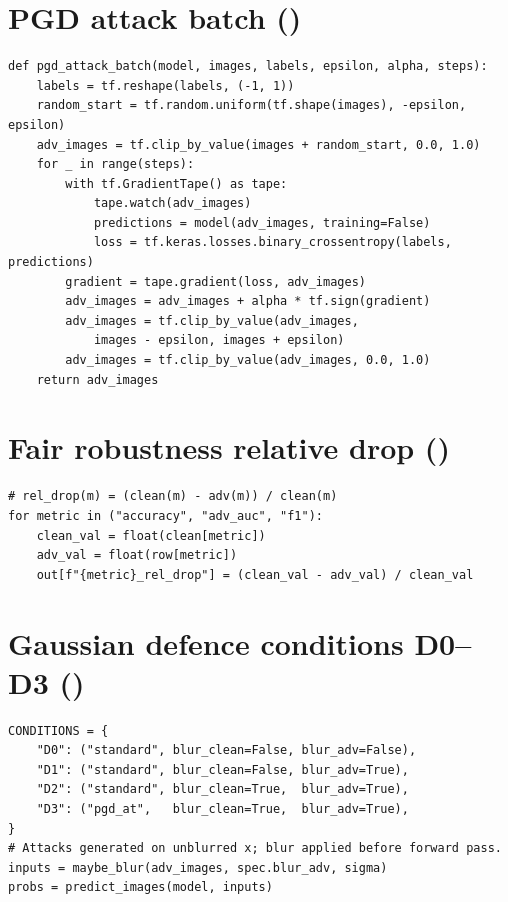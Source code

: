 \documentclass[12pt,a4paper,oneside]{report}
\begin{document}
\section{PGD attack batch ()}

\begin{lstlisting}
def pgd_attack_batch(model, images, labels, epsilon, alpha, steps):
    labels = tf.reshape(labels, (-1, 1))
    random_start = tf.random.uniform(tf.shape(images), -epsilon, epsilon)
    adv_images = tf.clip_by_value(images + random_start, 0.0, 1.0)
    for _ in range(steps):
        with tf.GradientTape() as tape:
            tape.watch(adv_images)
            predictions = model(adv_images, training=False)
            loss = tf.keras.losses.binary_crossentropy(labels, predictions)
        gradient = tape.gradient(loss, adv_images)
        adv_images = adv_images + alpha * tf.sign(gradient)
        adv_images = tf.clip_by_value(adv_images,
            images - epsilon, images + epsilon)
        adv_images = tf.clip_by_value(adv_images, 0.0, 1.0)
    return adv_images
\end{lstlisting}

\section{Fair robustness relative drop ()}

\begin{lstlisting}
# rel_drop(m) = (clean(m) - adv(m)) / clean(m)
for metric in ("accuracy", "adv_auc", "f1"):
    clean_val = float(clean[metric])
    adv_val = float(row[metric])
    out[f"{metric}_rel_drop"] = (clean_val - adv_val) / clean_val
\end{lstlisting}

\section{Gaussian defence conditions D0--D3 ()}

\begin{lstlisting}
CONDITIONS = {
    "D0": ("standard", blur_clean=False, blur_adv=False),
    "D1": ("standard", blur_clean=False, blur_adv=True),
    "D2": ("standard", blur_clean=True,  blur_adv=True),
    "D3": ("pgd_at",   blur_clean=True,  blur_adv=True),
}
# Attacks generated on unblurred x; blur applied before forward pass.
inputs = maybe_blur(adv_images, spec.blur_adv, sigma)
probs = predict_images(model, inputs)
\end{lstlisting}
\end{document}
